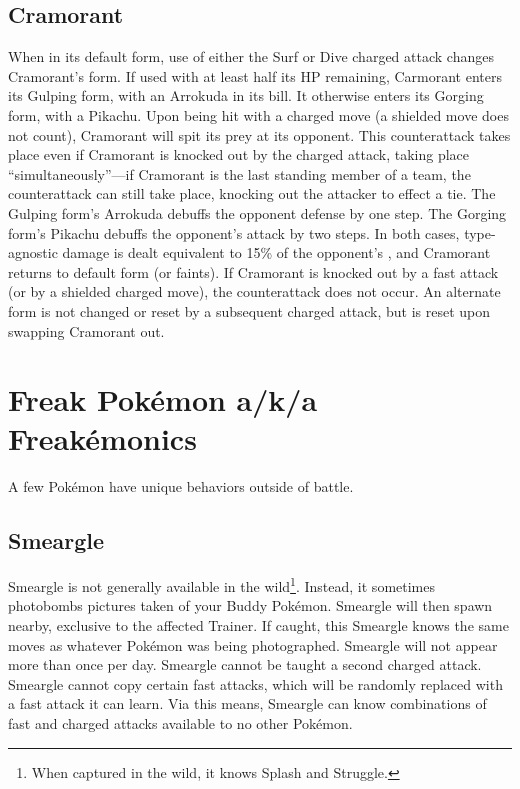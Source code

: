 \subsection{Cramorant\label{subsec:Cramorant}}
When in its default form, use of either the Surf or Dive charged attack changes Cramorant's form.
If used with at least half its HP remaining, Carmorant enters its Gulping form, with an Arrokuda in its bill.
It otherwise enters its Gorging form, with a Pikachu.
Upon being hit with a charged move (a shielded move does not count), Cramorant will spit its prey at its opponent.
This counterattack takes place even if Cramorant is knocked out by the charged attack,
 taking place ``simultaneously''---if Cramorant is the last standing member of a
 team, the counterattack can still take place, knocking out the attacker to effect a tie.
The Gulping form's Arrokuda debuffs the opponent defense by one step.
The Gorging form's Pikachu debuffs the opponent's attack by two steps.
In both cases, type-agnostic damage is dealt equivalent to 15\% of the opponent's \MHP{}, and Cramorant returns to default form
 (or faints).
If Cramorant is knocked out by a fast attack (or by a shielded charged move), the counterattack does not occur.
An alternate form is not changed or reset by a subsequent charged attack,
 but is reset upon swapping Cramorant out.

\section{Freak Pokémon a/k/a Freakémonics\label{sec:freaks}}
A few Pokémon have unique behaviors outside of battle.

\subsection{Smeargle\label{subsec:smeargle}}
Smeargle is not generally available in the wild\footnote{When captured in the wild, it knows Splash and Struggle.}.
Instead, it sometimes photobombs pictures taken of your Buddy Pokémon.
Smeargle will then spawn nearby, exclusive to the affected Trainer.
If caught, this Smeargle knows the same moves as whatever Pokémon was being photographed.
Smeargle will not appear more than once per day.
Smeargle cannot be taught a second charged attack.
Smeargle cannot copy certain fast attacks, which will be randomly replaced with
 a fast attack it can learn.
Via this means, Smeargle can know combinations of fast and charged attacks available
 to no other Pokémon.

